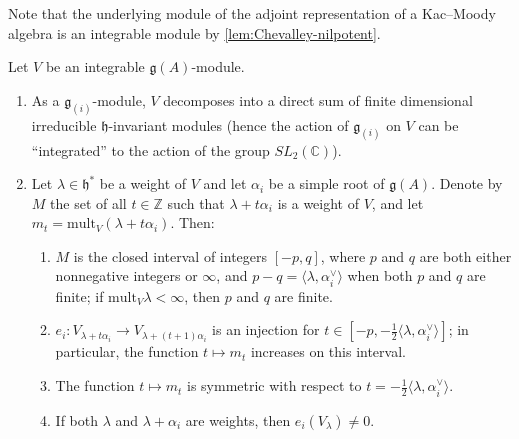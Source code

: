 \documentclass[12pt]{article}
\begin{document}
Note that the underlying module of the adjoint representation of a Kac--Moody algebra is an integrable module by \ref{lem:Chevalley-nilpotent}.

\begin{proposition}\label{prop:weights-integrable}
    Let $V$ be an integrable $\mathfrak{g}(A)$-module.
    \begin{enumerate}[label=(\alph*)]
        \item As a $\mathfrak{g}_{(i)}$-module, $V$ decomposes into a direct sum of finite dimensional irreducible
              $\mathfrak{h}$-invariant modules (hence the action of $\mathfrak{g}_{(i)}$ on $V$ can be ``integrated''
              to the action of the group $SL_2(\mathbb{C})$).

        \item Let $\lambda \in \mathfrak{h}^*$ be a weight of $V$ and let $\alpha_i$ be a simple root of $\mathfrak{g}(A)$.
              Denote by $M$ the set of all $t \in \mathbb{Z}$ such that $\lambda+t\alpha_i$ is a weight of $V$, and let
              $m_t = \mathrm{mult}_V(\lambda+t\alpha_i)$. Then:
              \begin{enumerate}[label=(\roman*)]
                  \item $M$ is the closed interval of integers $[-p,q]$, where $p$ and $q$ are both either nonnegative integers or $\infty$,
                        and $p-q=\langle \lambda,\alpha_i^\vee\rangle$ when both $p$ and $q$ are finite; if $\mathrm{mult}_V\lambda<\infty$, then $p$ and $q$ are finite.

                  \item $e_i: V_{\lambda+t\alpha_i}\to V_{\lambda+(t+1)\alpha_i}$ is an injection for $t\in[-p,-\tfrac{1}{2}\langle\lambda,\alpha_i^\vee\rangle]$;
                        in particular, the function $t\mapsto m_t$ increases on this interval.

                  \item The function $t\mapsto m_t$ is symmetric with respect to $t=-\tfrac{1}{2}\langle\lambda,\alpha_i^\vee\rangle$.

                  \item If both $\lambda$ and $\lambda+\alpha_i$ are weights, then $e_i(V_\lambda)\neq 0$.
              \end{enumerate}
    \end{enumerate}
\end{proposition}
\end{document}
